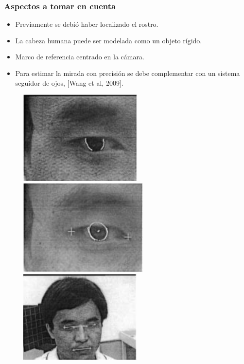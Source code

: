 \documentclass[10pt, compress]{beamer}
\begin{document}
\begin{frame}[fragile]
	\frametitle{Aspectos a tomar en cuenta}
	 \begin{itemize}
	 	\item Previamente se debió haber localizado el rostro.
	 	\item La cabeza humana puede ser modelada como un objeto rígido.
	 	\item Marco de referencia centrado en la cámara.
	 	\item Para estimar la mirada con precisión se debe complementar con un sistema seguidor de ojos, [Wang et al, 2009].
	 \end{itemize}
	 
	 \begin{figure}[htbp] 
	 	\centering
	 	\includegraphics[width=.27\textwidth]{./pictures/gaze1}
	 	\includegraphics[width=.28\textwidth]{./pictures/gaze2}
	 	\includegraphics[width=.27\textwidth]{./pictures/gaze3}
	 \end{figure}	
\end{frame}
	
\end{document}
